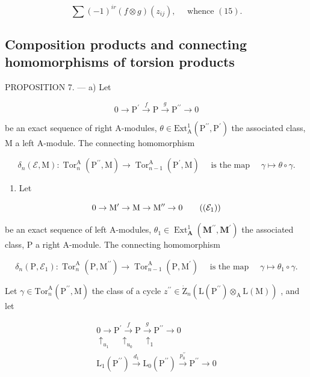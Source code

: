 \[
\sum (- 1) ^ {i r} (f \otimes g) (z _ {i j}), \quad \text { whence } (1 5).
\]

\subsection{Composition products and connecting homomorphisms of torsion products}

PROPOSITION 7. --- a) Let

\[
0 \to \mathrm{P} ^ {\prime} \xrightarrow {f} \mathrm{P} \xrightarrow {g} \mathrm{P} ^ {\prime \prime} \to 0\tag{8}
\]

be an exact sequence of right A-modules, \(\theta\in\mathrm{Ext}_{\mathrm{A}}^{1}\left(\mathrm{P}^{\prime\prime},\mathrm{P}^{\prime}\right)\) the associated class, M a left A-module. The connecting homomorphism

\[
\delta_ {n} (\mathcal {E}, \mathrm{M}): \operatorname{Tor} _ {n} ^ {\mathrm{A}} \left(\mathrm{P} ^ {\prime \prime}, \mathrm{M}\right)\rightarrow \operatorname{Tor} _ {n - 1} ^ {\mathrm{A}} \left(\mathrm{P} ^ {\prime}, \mathrm{M}\right) \quad \text { is the map } \quad\gamma \mapsto \theta \circ \gamma .
\]

\begin{enumerate}
\def\labelenumi{\alph{enumi})}
\setcounter{enumi}{1}
\tightlist
\item
  Let
\end{enumerate}

\[
0 \rightarrow \mathrm{M} ^ {\prime} \rightarrow \mathrm{M} \rightarrow \mathrm{M} ^ {\prime \prime} \rightarrow 0\tag{$(\mathcal{E}_1)$}
\]

be an exact sequence of left A-modules, \(\theta_{1} \in \operatorname{Ext}_{\mathbf{A}}^{1}(\mathbf{M}^{\prime \prime}, \mathbf{M}^{\prime})\) the associated class, P a right A-module. The connecting homomorphism

\[
\delta_ {n} (\mathrm{P}, \mathcal {E} _ {1}): \operatorname{Tor} _ {n} ^ {\mathrm{A}} (\mathrm{P}, \mathrm{M} ^ {\prime \prime}) \rightarrow \operatorname{Tor} _ {n - 1} ^ {\mathrm{A}} (\mathrm{P}, \mathrm{M} ^ {\prime}) \quad \text { is the map } \quad\gamma \mapsto \theta_ {1} \circ \gamma .
\]

Let \(\gamma\in\mathrm{Tor}_{n}^{\mathrm{A}}(\mathrm{P}^{\prime\prime},\mathrm{M})\) the class of a cycle \(z^{\prime\prime}\in\dot{\mathrm{Z}}_{n}(\mathrm{L}(\mathrm{P}^{\prime\prime})\otimes_{\mathrm{A}}\mathrm{L}(\mathrm{M}))\) , and let

\[
\begin{array}{c} 0 \longrightarrow \mathrm{P} ^ {\prime} \xrightarrow {f} \mathrm{P} \xrightarrow {g} \mathrm{P} ^ {\prime \prime} \longrightarrow 0 \\ \uparrow_ {u _ {1}} \quad \uparrow_ {u _ {0}} \quad \uparrow_ {1} \\ \mathrm{L} _ {1} (\mathrm{P} ^ {\prime \prime}) \xrightarrow {d _ {1}} \mathrm{L} _ {0} (\mathrm{P} ^ {\prime \prime}) \xrightarrow {p _ {0} ^ {\prime \prime}} \mathrm{P} ^ {\prime \prime} \longrightarrow 0 \end{array}
\]


